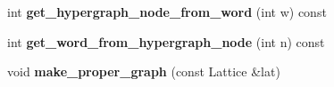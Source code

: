 \begin{DoxyCompactItemize}
\item 
\hypertarget{class_forest_lattice_a01fa72075f1de8421dd21e15540ce5c0}{
int {\bfseries get\_\-hypergraph\_\-node\_\-from\_\-word} (int w) const }
\label{class_forest_lattice_a01fa72075f1de8421dd21e15540ce5c0}

\item 
\hypertarget{class_forest_lattice_a226887bedd13a3f3dc5cbe91242bd17a}{
int {\bfseries get\_\-word\_\-from\_\-hypergraph\_\-node} (int n) const }
\label{class_forest_lattice_a226887bedd13a3f3dc5cbe91242bd17a}

\item 
\hypertarget{class_forest_lattice_a8f474062475f4d272a8d8b676cdd0118}{
void {\bfseries make\_\-proper\_\-graph} (const Lattice \&lat)}
\label{class_forest_lattice_a8f474062475f4d272a8d8b676cdd0118}

\end{DoxyCompactItemize}
